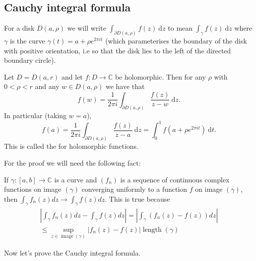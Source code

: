 \documentclass[egregdoesnotlikesansseriftitles,a4paper]{scrartcl}
\begin{document}
\subsection{Cauchy integral formula}
\begin{notation}
     For a disk $D (a,\rho)$ we will write $\int_{ \partial D (a, \rho)}^{}f (z) \ \mathrm{d}z $ to mean $\int_{\gamma}^{}f (z) \ \mathrm{d}z $ where $\gamma$ is the curve $\gamma (t)=a+\rho e^{2\pi i t}$ (which parameterises the boundary of the disk with positive orientation, i.e so that the disk lies to the left of the directed boundary circle). 
\end{notation}
\begin{theorem}\label{cif}
      Let $D=D (a,r)$ and let $f: D \rightarrow \mathbb{C}$ be holomorphic. Then for any $\rho$ with $0 < \rho< r$ and any $w \in D (a, \rho)$ we have that \[
      f (w)=\frac{1}{2\pi i} \int_{ \partial D (a, \rho)}^{} \frac{f (z)}{z-w} \ \mathrm{d}z
      .\] In particular (taking $w=a$), \[
          f (a)=\frac{1}{2\pi i} \int_{ \partial D (a, \rho)}^{} \frac{f (z)}{z-a} \ \mathrm{d}z= \int_{0}^{1}f (a+ \rho e^{2\pi it}) \ \mathrm{d}t 
      .\] This is called the  for holomorphic functions.
\end{theorem}
For the proof we will need the following fact:
\begin{lemma}
      If $\gamma: [a,b] \rightarrow \mathbb{C}$ is a curve and $\left(f_{n}\right)$ is a sequence of continuous complex functions on image $(\gamma)$ converging uniformly to a function $f$ on image $(\gamma)$, then $\int_{\gamma} f_{n}(z) d z \rightarrow \int_{\gamma} f(z) d z$.
      This is true because
      $$
      \begin{array}{r}
      \left|\int_{\gamma} f_{n}(z) d z-\int_{\gamma} f(z) d z\right|=\left|\int_{\gamma}\left(f_{n}(z)-f(z)\right) d z\right| \\
      \leq \sup _{z \in \operatorname{image}(\gamma)}\left|f_{n}(z)-f(z)\right| \operatorname{length}(\gamma)
      \end{array}
      $$
\end{lemma}
Now let's prove the Cauchy integral formula.
\end{document}
